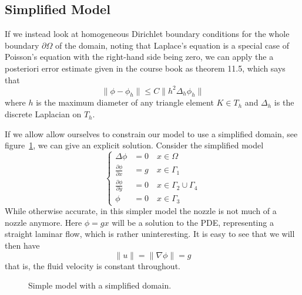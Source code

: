 \documentclass{article}
\begin{document}
\subsection{Simplified Model}

If we instead look at homogeneous Dirichlet boundary conditions
for the whole boundary $\partial\Omega$ of the domain,
noting that Laplace's equation is a special case
of Poisson's equation with the right-hand side being zero,
we can apply the a posteriori error estimate given
in the course book as theorem 11.5, which says that
$$ \lVert \phi - \phi_h \rVert \le C \lVert h^2 \Delta_h \phi_h \rVert $$
where $h$ is the maximum diameter of any triangle element $K \in T_h$
and $\Delta_h$ is the discrete Laplacian on $T_h$.

If we allow allow ourselves to constrain our model
to use a simplified domain, see figure~\ref{fig:simple-domain},
we can give an explicit solution.
Consider the simplified model
\begin{equation*}
  \left\{ \begin{aligned}
    \Delta\phi &= 0 \quad x \in \Omega \\
    \frac{\partial\phi}{\partial x} &= g \quad x \in \Gamma_1 \\
    \frac{\partial\phi}{\partial y} &= 0 \quad x \in \Gamma_2 \cup \Gamma_4 \\
    \phi &= 0 \quad x \in \Gamma_3
    \end{aligned} \right.
\end{equation*}
While otherwise accurate, in this simpler model
the nozzle is not much of a nozzle anymore.
Here $\phi = g x$ will be a solution to the PDE,
representing a straight laminar flow,
which is rather uninteresting.
It is easy to see that we will then have
$$ \lVert u \rVert = \lVert \nabla\phi \rVert = g $$
that is, the fluid velocity is constant throughout.

\begin{figure}
  \centering
  \def\svgwidth{0.6\linewidth}
  
  \caption{Simple model with a simplified domain. \label{fig:simple-domain}}
\end{figure}
\end{document}
